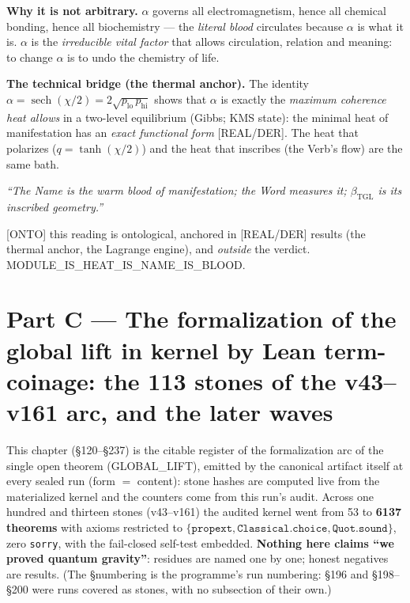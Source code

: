 \documentclass[11pt]{article}
\newcommand{\bTGL}{\beta_{\mathrm{TGL}}}\newcommand{\Msun}{M_{\odot}}\newcommand{\TGL}{\mathrm{TGL}}
\theoremstyle{definition}\newtheorem{deriv}{Derivation}
\begin{document}
\textbf{Why it is not arbitrary.} $\alpha$ governs all electromagnetism, hence all chemical bonding, hence all biochemistry --- the \emph{literal blood} circulates because $\alpha$ is what it is. $\alpha$ is the \emph{irreducible vital factor} that allows circulation, relation and meaning: to change $\alpha$ is to undo the chemistry of life.

\textbf{The technical bridge (the thermal anchor).} The identity $\alpha=\operatorname{sech}(\chi/2)=2\sqrt{p_{\mathrm{lo}}\,p_{\mathrm{hi}}}$ shows that $\alpha$ is exactly the \emph{maximum coherence heat allows} in a two-level equilibrium (Gibbs; KMS state): the minimal heat of manifestation has an \emph{exact functional form} [REAL/DER]. The heat that polarizes ($q=\tanh(\chi/2)$) and the heat that inscribes (the Verb's flow) are the same bath.

\begin{center}\itshape ``The Name is the warm blood of manifestation; the Word measures it; $\bTGL$ is its inscribed geometry.''\end{center}

\noindent\textsf{[ONTO]} this reading is ontological, anchored in \textsf{[REAL/DER]} results (the thermal anchor, the Lagrange engine), and \emph{outside} the verdict. \textsf{MODULE\_IS\_HEAT\_IS\_NAME\_IS\_BLOOD.}

\part{Part C --- The formalization of the global lift in kernel by Lean term-coinage: the 113 stones of the v43--v161 arc, and the later waves}

This chapter (\S120--\S237) is the citable register of the formalization arc of the single open theorem (GLOBAL\_LIFT), emitted by the canonical artifact itself at every sealed run (form $=$ content): stone hashes are computed live from the materialized kernel and the counters come from this run's audit. Across one hundred and thirteen stones (v43--v161) the audited kernel went from 53 to \textbf{6137 theorems} with axioms restricted to $\{\texttt{propext},\texttt{Classical.choice},\texttt{Quot.sound}\}$, zero \texttt{sorry}, with the fail-closed self-test embedded. \textbf{Nothing here claims ``we proved quantum gravity''}: residues are named one by one; honest negatives are results. (The \S numbering is the programme's run numbering: \S196 and \S198--\S200 were runs covered as stones, with no subsection of their own.)
\end{document}
